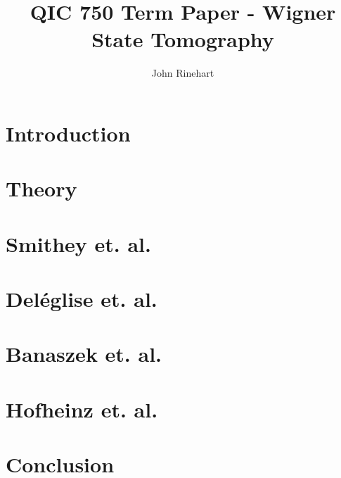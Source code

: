 \documentclass[letterpaper,twoside,12pt]{article}
\begin{document}
\pagestyle{empty} %



\title{QIC 750 Term Paper - Wigner State Tomography}
\author{John Rinehart}
\maketitle	



\pagestyle{plain} %

\section{Introduction}
\section{Theory}


\section{Smithey et. al.}


\section{Del\'{e}glise et. al.}


\section{Banaszek et. al.}


\section{Hofheinz et. al.}


\section{Conclusion}

\end{document}
